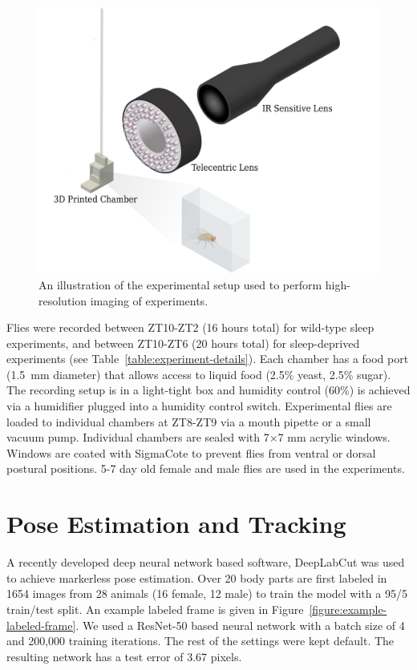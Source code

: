 \begin{figure}[htb!]
	\centering
	\includegraphics[width=0.8\linewidth]{figures/ExperimentalSetup.pdf}
	\caption[An illustration of the experimental setup used to perform high-resolution imaging of experiments.]{An illustration of the experimental setup used to perform high-resolution imaging of experiments.\label{figure:experiment-setup}}
\end{figure}

Flies were recorded between ZT10-ZT2 (16 hours total) for wild-type sleep experiments, and between ZT10-ZT6 (20 hours total) for sleep-deprived experiments (see Table~\ref{table:experiment-details}).
Each chamber has a food port (1.5 mm diameter) that allows access to liquid food (2.5\% yeast, 2.5\% sugar).
The recording setup is in a light-tight box and humidity control (60\%) is achieved via a humidifier plugged into a humidity control switch.
Experimental flies are loaded to individual chambers at ZT8-ZT9 via a mouth pipette or a small vacuum pump.
Individual chambers are sealed with 7×7 mm acrylic windows.
Windows are coated with SigmaCote to prevent flies from ventral or dorsal postural positions.
5-7 day old female and male flies are used in the experiments.

\section{Pose Estimation and Tracking}
A recently developed deep neural network based software, DeepLabCut \citep{mathis_deeplabcut_2018} was used to achieve markerless pose estimation.
Over 20 body parts are first labeled in 1654 images from 28 animals (16 female, 12 male) to train the model with a 95/5 train/test split.
An example labeled frame is given in Figure~\ref{figure:example-labeled-frame}.
We used a ResNet-50 \citep{he_deep_2016} based neural network with a batch size of 4 and 200,000 training iterations.
The rest of the settings were kept default.
The resulting network has a test error of 3.67 pixels.

